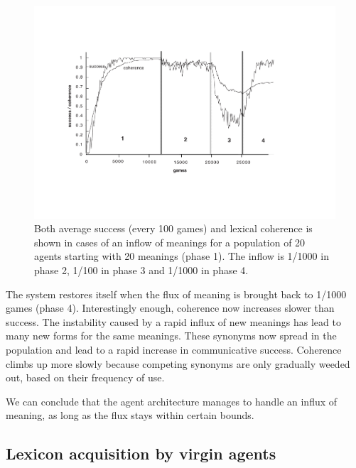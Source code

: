\begin{figure}[htbp]
  \centerline{\includegraphics[width=\textwidth]{chap5/figs/in+out.pdf}}
\caption{\label{inoutmean}Both average success (every 100 games) and lexical coherence 
is shown in cases of an inflow of meanings for a population 
of 20 agents starting with 20 meanings (phase 1). The inflow 
is 1/1000 in phase 2, 1/100 in phase 3 and 1/1000 in phase 4.}
\end{figure}

The system restores itself
when the flux of meaning is brought back to 1/1000 games
(phase 4). Interestingly enough, coherence now increases slower
than success. 
The instability caused by a rapid influx of new meanings has lead 
to many new forms for the same meanings. These synonyms
now spread in the population and lead to a rapid
increase in communicative success. Coherence
climbs up more slowly because competing synonyms 
are only gradually weeded out, based on their frequency of use. 

We can conclude that the agent architecture
manages to handle an influx of meaning, as long as the flux 
stays within certain bounds. 

\subsection{Lexicon acquisition by virgin agents}

